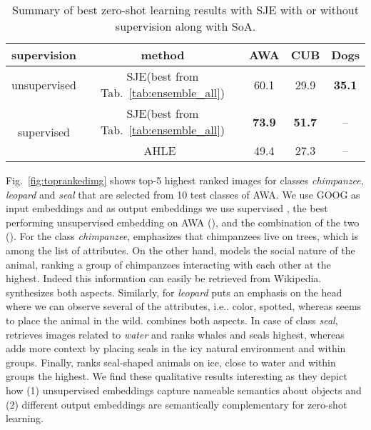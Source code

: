 \documentclass[10pt,twocolumn,letterpaper]{article}
\makeatletter
\newcommand{\cutcaptiondown}{\vspace*{-0.12in}}
\newcommand{\myparagraph}[1]{\vspace{2pt}\noindent{\bf #1}}
\newcommand{\SJE}{SJE\xspace}
\DeclareRobustCommand\onedot{\futurelet\@let@token\@onedot}
\def\@onedot{\ifx\@let@token.\else.\null\fi\xspace}
\def\ie{{i.e}\onedot} \def\Ie{{I.e}\onedot}
\makeatother
\begin{document}
\begin{table}[t]
 \begin{center}
   \small
  \begin{tabular}{c|c|c|c|c}
	\hline
	supervision & method &\textbf{AWA} & \textbf{CUB} & \textbf{Dogs} \\
	\hline
	unsupervised & \SJE (best from Tab.~\ref{tab:ensemble_all}) & 60.1 & 29.9 & \textbf{35.1}\\
	\hline
	\multirow{2}{*}{supervised} & \SJE (best from Tab.~\ref{tab:ensemble_all}) & \textbf{73.9} & \textbf{51.7} & -- \\
	 & AHLE~\cite{APHS15} & 49.4 & 27.3 & -- \\
	\hline
  \end{tabular}
 \end{center}
\caption{Summary of best zero-shot learning results with \SJE with or without supervision along with SoA.} \vspace{-3mm} 
\cutcaptiondown
\label{tab:summary_all}
\end{table}


\myparagraph{Qualitative Results.} Fig.~\ref{fig:toprankedimg} shows top-5 highest ranked images for classes \emph{chimpanzee}, \emph{leopard} and \emph{seal} that are selected from 10 test classes of AWA. We use GOOG as input embeddings and as output embeddings we use supervised , the best performing unsupervised embedding on AWA (), and the combination of the two (). For the class \emph{chimpanzee},  emphasizes that chimpanzees live on trees, which is among the list of attributes. On the other hand,  models the social nature of the animal, ranking a group of chimpanzees interacting with each other at the highest. Indeed this information can easily be retrieved from Wikipedia.  synthesizes both aspects. Similarly, for \emph{leopard}  puts an emphasis on the head where we can observe several of the attributes, \ie color, spotted, whereas  seems to place the animal in the wild.  combines both aspects. In case of class \emph{seal},  retrieves images related to \emph{water} and ranks whales and seals highest, whereas  adds more context by placing seals in the icy natural environment and within groups. Finally,  ranks seal-shaped animals on ice, close to water and within groups the highest. We find these qualitative results interesting as they depict how (1) unsupervised embeddings capture nameable semantics about objects and (2) different output embeddings are semantically complementary for zero-shot learning.  
\end{document}
